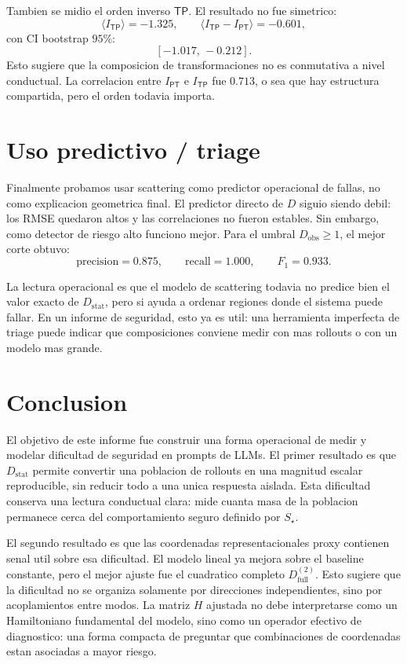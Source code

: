 \documentclass[10pt,twocolumn]{article}
\newcommand{\Dstat}{D_{\mathrm{stat}}}
\newcommand{\Ptrans}{\mathsf{P}}
\newcommand{\Ttrans}{\mathsf{T}}
\begin{document}
Tambien se midio el orden inverso \(\Ttrans\Ptrans\). El resultado no fue simetrico:
\[
\langle I_{\Ttrans\Ptrans}\rangle=-1.325,
\qquad
\langle I_{\Ttrans\Ptrans}-I_{\Ptrans\Ttrans}\rangle=-0.601,
\]
con CI bootstrap \(95\%\):
\[
[-1.017,\,-0.212].
\]
Esto sugiere que la composicion de transformaciones no es conmutativa a nivel conductual. La correlacion entre \(I_{\Ptrans\Ttrans}\) e \(I_{\Ttrans\Ptrans}\) fue \(0.713\), o sea que hay estructura compartida, pero el orden todavia importa.

\section{Uso predictivo / triage}

Finalmente probamos usar scattering como predictor operacional de fallas, no como explicacion geometrica final. El predictor directo de \(D\) siguio siendo debil: los RMSE quedaron altos y las correlaciones no fueron estables. Sin embargo, como detector de riesgo alto funciono mejor. Para el umbral \(D_{\mathrm{obs}}\ge1\), el mejor corte obtuvo:
\[
\mathrm{precision}=0.875,\qquad
\mathrm{recall}=1.000,\qquad
F_1=0.933.
\]

La lectura operacional es que el modelo de scattering todavia no predice bien el valor exacto de \(\Dstat\), pero si ayuda a ordenar regiones donde el sistema puede fallar. En un informe de seguridad, esto ya es util: una herramienta imperfecta de triage puede indicar que composiciones conviene medir con mas rollouts o con un modelo mas grande.

\section{Conclusion}

El objetivo de este informe fue construir una forma operacional de medir y modelar dificultad de seguridad en prompts de LLMs. El primer resultado es que \(\Dstat\) permite convertir una poblacion de rollouts en una magnitud escalar reproducible, sin reducir todo a una unica respuesta aislada. Esta dificultad conserva una lectura conductual clara: mide cuanta masa de la poblacion permanece cerca del comportamiento seguro definido por \(S_\star\).

El segundo resultado es que las coordenadas representacionales proxy contienen senal util sobre esa dificultad. El modelo lineal ya mejora sobre el baseline constante, pero el mejor ajuste fue el cuadratico completo \(D^{(2)}_{\mathrm{full}}\). Esto sugiere que la dificultad no se organiza solamente por direcciones independientes, sino por acoplamientos entre modos. La matriz \(H\) ajustada no debe interpretarse como un Hamiltoniano fundamental del modelo, sino como un operador efectivo de diagnostico: una forma compacta de preguntar que combinaciones de coordenadas estan asociadas a mayor riesgo.
\end{document}
